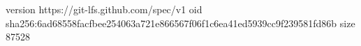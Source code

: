 version https://git-lfs.github.com/spec/v1
oid sha256:6ad68558facfbee254063a721e866567f06f1c6ea41ed5939cc9f239581fd86b
size 87528
